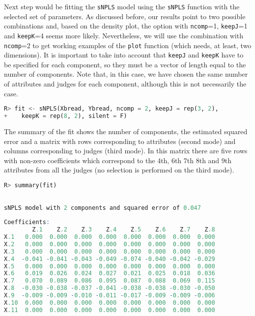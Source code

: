 Next step would be fitting the \texttt{sNPLS} model using the \texttt{sNPLS} function with the selected set of parameters. As discussed before, our results point to two possible combinations and, based on the density plot, the option with \texttt{ncomp}=1, \texttt{keepJ}=1 and \texttt{keepK}=4 seems more likely. Nevertheless, we will use the combination with \texttt{ncomp}=2 to get working examples of the \texttt{plot} function (which needs, at least, two dimensions). It is important to take into account that \texttt{keepJ} and \texttt{keepK} have to be specified for each component, so they must be a vector of length equal to the number of components. Note that, in this case, we have chosen the same number of attributes and judges for each component, although this is not necessarily the case.

\vspace{15pt}
\begin{lstlisting}[basicstyle=\small, language=Python, morekeywords={sNPLS, rep}]
R> fit <- sNPLS(Xbread, Ybread, ncomp = 2, keepJ = rep(3, 2), 
+    keepK = rep(8, 2), silent = F)
\end{lstlisting}   

The summary of the fit shows the number of components, the estimated squared error and a matrix with rows corresponding to attributes (second mode) and columns corresponding to judges (third mode). In this matrix there are five rows with non-zero coefficients which correspond to the 4th, 6th 7th 8th and 9th attributes from all the judges (no selection is performed on the third mode).

\vspace{15pt}
\begin{lstlisting}[basicstyle=\small, language=Python, morekeywords={summary}]
R> summary(fit)
\end{lstlisting}   

\begin{lstlisting}[basicstyle=\small, backgroundcolor=\color{output}, numbers=none, label={output4}, language=R, deletekeywords={model}, caption=Summary with the coefficients of the fitted model.]

sNPLS model with 2 components and squared error of 0.047 
 
Coefficients: 
        Z.1    Z.2    Z.3    Z.4    Z.5    Z.6    Z.7    Z.8
X.1   0.000  0.000  0.000  0.000  0.000  0.000  0.000  0.000
X.2   0.000  0.000  0.000  0.000  0.000  0.000  0.000  0.000
X.3   0.000  0.000  0.000  0.000  0.000  0.000  0.000  0.000
X.4  -0.041 -0.041 -0.043 -0.049 -0.074 -0.040 -0.042 -0.029
X.5   0.000  0.000  0.000  0.000  0.000  0.000  0.000  0.000
X.6   0.019  0.026  0.024  0.027  0.021  0.025  0.018  0.036
X.7   0.070  0.089  0.086  0.095  0.087  0.088  0.069  0.115
X.8  -0.030 -0.038 -0.037 -0.041 -0.038 -0.038 -0.030 -0.050
X.9  -0.009 -0.009 -0.010 -0.011 -0.017 -0.009 -0.009 -0.006
X.10  0.000  0.000  0.000  0.000  0.000  0.000  0.000  0.000
X.11  0.000  0.000  0.000  0.000  0.000  0.000  0.000  0.000
\end{lstlisting}  


